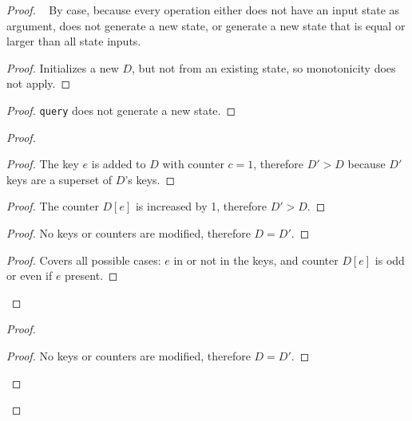\documentclass[9pt, oneside]{article}   	%
\begin{document}
\begin{proof}

		\pfsketch~ By case, because every operation either does not have an input state as argument, does not generate a new state, or generate a new state that is equal or larger than all state inputs.
		\begin{proof}
			Initializes a new $D$, but not from an existing state, so monotonicity does not apply.
		\end{proof}
		
		\begin{proof}
			\texttt{query} does not generate a new state.
		\end{proof}
		
		\begin{proof}
			\begin{proof}
				The key $e$ is added to $D$ with counter $c=1$, therefore $D' > D$ because $D'$ keys are a superset of $D$'s keys.
			\end{proof}
			
			\begin{proof}
				The counter $D[e]$ is increased by 1, therefore $D' > D$.
			\end{proof}
			
			\begin{proof}
				No keys or counters are modified, therefore $D=D'$.
			\end{proof}
			
			\qedstep
			\begin{proof}
				Covers all possible cases: $e$ in or not in the keys, and counter $D[e]$ is odd or even if $e$ present.
			\end{proof}
		\end{proof}
		
		\begin{proof}
			\begin{proof}
				No keys or counters are modified, therefore $D=D'$.
			\end{proof}
			

\end{proof}
\end{proof}
\end{document}
